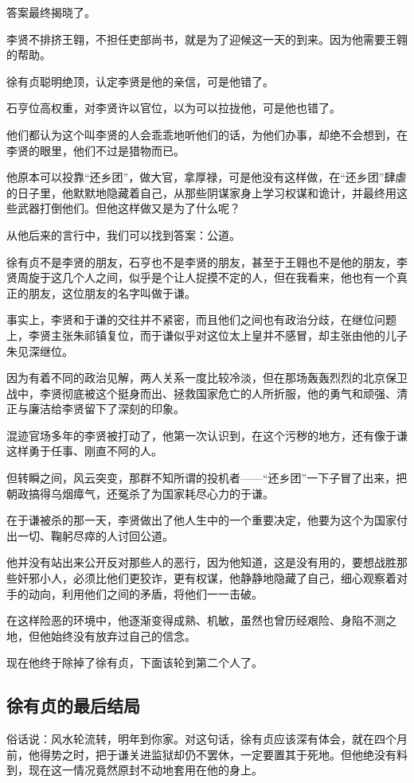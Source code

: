 \begin{multicols}{\theparacolNo}
		答案最终揭晓了。

		李贤不排挤王翱，不担任吏部尚书，就是为了迎候这一天的到来。因为他需要王翱的帮助。

		徐有贞聪明绝顶，认定李贤是他的亲信，可是他错了。

		石亨位高权重，对李贤许以官位，以为可以拉拢他，可是他也错了。

		他们都认为这个叫李贤的人会乖乖地听他们的话，为他们办事，却绝不会想到，在李贤的眼里，他们不过是猎物而已。

		他原本可以投靠“还乡团”，做大官，拿厚禄，可是他没有这样做，在“还乡团”肆虐的日子里，他默默地隐藏着自己，从那些阴谋家身上学习权谋和诡计，并最终用这些武器打倒他们。但他这样做又是为了什么呢？

		从他后来的言行中，我们可以找到答案：公道。

		徐有贞不是李贤的朋友，石亨也不是李贤的朋友，甚至于王翱也不是他的朋友，李贤周旋于这几个人之间，似乎是个让人捉摸不定的人，但在我看来，他也有一个真正的朋友，这位朋友的名字叫做于谦。

		事实上，李贤和于谦的交往并不紧密，而且他们之间也有政治分歧，在继位问题上，李贤主张朱祁镇复位，而于谦似乎对这位太上皇并不感冒，却主张由他的儿子朱见深继位。

		因为有着不同的政治见解，两人关系一度比较冷淡，但在那场轰轰烈烈的北京保卫战中，李贤彻底被这个挺身而出、拯救国家危亡的人所折服，他的勇气和顽强、清正与廉洁给李贤留下了深刻的印象。

		混迹官场多年的李贤被打动了，他第一次认识到，在这个污秽的地方，还有像于谦这样勇于任事、刚直不阿的人。

		但转瞬之间，风云突变，那群不知所谓的投机者——“还乡团”一下子冒了出来，把朝政搞得乌烟瘴气，还冤杀了为国家耗尽心力的于谦。

		在于谦被杀的那一天，李贤做出了他人生中的一个重要决定，他要为这个为国家付出一切、鞠躬尽瘁的人讨回公道。

		他并没有站出来公开反对那些人的恶行，因为他知道，这是没有用的，要想战胜那些奸邪小人，必须比他们更狡诈，更有权谋，他静静地隐藏了自己，细心观察着对手的动向，利用他们之间的矛盾，将他们一一击破。

		在这样险恶的环境中，他逐渐变得成熟、机敏，虽然也曾历经艰险、身陷不测之地，但他始终没有放弃过自己的信念。

		现在他终于除掉了徐有贞，下面该轮到第二个人了。

		\subsection{徐有贞的最后结局}
		俗话说：风水轮流转，明年到你家。对这句话，徐有贞应该深有体会，就在四个月前，他得势之时，把于谦关进监狱却仍不罢休，一定要置其于死地。但他绝没有料到，现在这一情况竟然原封不动地套用在他的身上。


\end{multicols}
